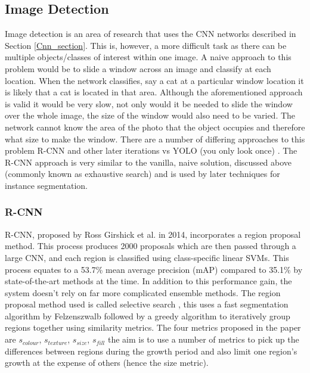 \documentclass[11pt,twoside]{report}
\begin{document}
\subsection{Image Detection} \label{Image_det}
Image detection is an area of research that uses the CNN networks described in Section \ref{Cnn_section}. This is, however, a more difficult task as there can be multiple objects/classes of interest within one image. A naive approach to this problem would be to slide a window across an image and classify at each location. When the network classifies, say a cat at a particular window location it is likely that a cat is located in that area.
\newline \newline
Although the aforementioned approach is valid it would be very slow, not only would it be needed to slide the window over the whole image, the size of the window would also need to be varied. The network cannot know the area of the photo that the object occupies and therefore what size to make the window. There are a number of differing approaches to this problem R-CNN \cite{DBLP:journals/corr/GirshickDDM13} and other later iterations vs YOLO (you only look once) \cite{DBLP:journals/corr/RedmonDGF15}. The R-CNN approach is very similar to the vanilla, naive solution, discussed above (commonly known as exhaustive search) and is used by later techniques for instance segmentation.


\subsubsection{R-CNN} \label{rcnn}
R-CNN, proposed by Ross Girshick et al. \cite{DBLP:journals/corr/GirshickDDM13} in 2014, incorporates a region proposal method. This process produces 2000 proposals which are then passed through a large CNN, and each region is classified using class-specific linear SVMs. This process equates to a 53.7\% mean average precision (mAP) compared to 35.1\% by state-of-the-art methods at the time. In addition to this performance gain, the system doesn't rely on far more complicated ensemble methods.
\newline \newline
The region proposal method used is called selective search \cite{Uijlings2013}, this uses a fast segmentation algorithm by Felzenszwalb \cite{Felzenszwalb2004} followed by a greedy algorithm to iteratively group regions together using similarity metrics. The four metrics proposed in the paper are $s_{colour}$, $s_{texture}$, $s_{size}$, $s_{fill}$  the aim is to use a number of metrics to pick up the differences between regions during the growth period and also limit one region's growth at the expense of others (hence the size metric).
\end{document}
